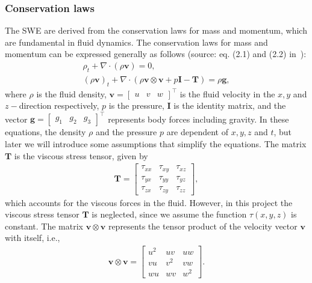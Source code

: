 \subsubsection*{Conservation laws}
The SWE are derived from the conservation laws for mass and momentum, which are fundamental in fluid dynamics.
The conservation laws for mass and momentum can be expressed generally as follows (source: eq. (2.1) and (2.2) in~\cite{Toro2001-Shock}):
\begin{align}
    \rho_t + \nabla \cdot (\rho \mathbf{v}) = 0, \label{eq:mass_conservation} \\
    {(\rho \mathbf{v})}_t + \nabla \cdot (\rho \mathbf{v} \otimes \mathbf{v} + p \mathbf{I} - \mathbf{T}) = \rho \mathbf{g}, \label{eq:momentum_conservation}
\end{align}
where $\rho$ is the fluid density, $\mathbf{v} = \begin{bmatrix} u & v & w \end{bmatrix}^\top$ is the fluid velocity in the $x, y$ and $z-$direction respectively,
$p$ is the pressure, $\mathbf{I}$ is the identity matrix, and the vector $\mathbf{g} = \begin{bmatrix}
    g_1 & g_2 & g_3
\end{bmatrix}^\top$ represents body forces including gravity.
In these equations, the density $\rho$ and the pressure $p$ are dependent of $x, y, z$ and $t$, but later we will introduce some assumptions that simplify the equations.
The matrix $\mathbf{T}$ is the viscous stress tensor, given by
\begin{align*}
    \mathbf{T} = \begin{bmatrix}
        \tau_{xx} & \tau_{xy} & \tau_{xz} \\
        \tau_{yx} & \tau_{yy} & \tau_{yz} \\
        \tau_{zx} & \tau_{zy} & \tau_{zz}
    \end{bmatrix},
\end{align*}
which accounts for the viscous forces in the fluid.
However, in this project the viscous stress tensor $\mathbf{T}$ is neglected, since we assume the function $\tau(x,y,z)$ is constant.
The matrix $\mathbf{v} \otimes \mathbf{v}$ represents the tensor product of the velocity vector $\mathbf{v}$ with itself, i.e.,
\begin{align*}
    \mathbf{v} \otimes \mathbf{v} = \begin{bmatrix}
        u^2 & uv & uw \\
        vu & v^2 & vw \\
        wu & wv & w^2
    \end{bmatrix}.
\end{align*}
